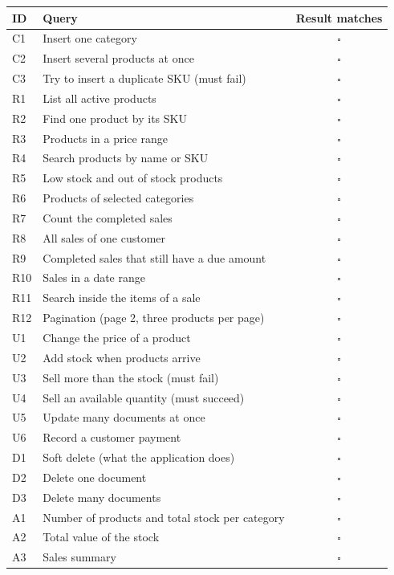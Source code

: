 \documentclass[11pt,a4paper]{article}
\begin{document}
\begin{longtable}{@{}P{1.2cm}P{10.6cm}c@{}}
\toprule
\textbf{ID} & \textbf{Query} & \textbf{Result matches} \\
\midrule
\endhead
C1 & Insert one category & $\square$ \\
C2 & Insert several products at once & $\square$ \\
C3 & Try to insert a duplicate SKU (must fail) & $\square$ \\
R1 & List all active products & $\square$ \\
R2 & Find one product by its SKU & $\square$ \\
R3 & Products in a price range & $\square$ \\
R4 & Search products by name or SKU & $\square$ \\
R5 & Low stock and out of stock products & $\square$ \\
R6 & Products of selected categories & $\square$ \\
R7 & Count the completed sales & $\square$ \\
R8 & All sales of one customer & $\square$ \\
R9 & Completed sales that still have a due amount & $\square$ \\
R10 & Sales in a date range & $\square$ \\
R11 & Search inside the items of a sale & $\square$ \\
R12 & Pagination (page 2, three products per page) & $\square$ \\
U1 & Change the price of a product & $\square$ \\
U2 & Add stock when products arrive & $\square$ \\
U3 & Sell more than the stock (must fail) & $\square$ \\
U4 & Sell an available quantity (must succeed) & $\square$ \\
U5 & Update many documents at once & $\square$ \\
U6 & Record a customer payment & $\square$ \\
D1 & Soft delete (what the application does) & $\square$ \\
D2 & Delete one document & $\square$ \\
D3 & Delete many documents & $\square$ \\
A1 & Number of products and total stock per category & $\square$ \\
A2 & Total value of the stock & $\square$ \\
A3 & Sales summary & $\square$ \\

\end{longtable}
\end{document}
